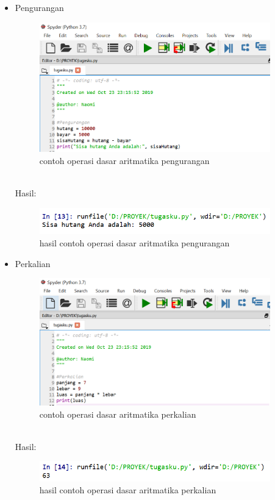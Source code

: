 \begin{enumerate}
\begin{itemize}
\item Pengurangan
\begin{figure}[!htbp]
\centering
\includegraphics[width=10cm]{gambar2/kurang.png}
\caption{contoh operasi dasar aritmatika pengurangan}
\end{figure}\\
\newpage
Hasil:
\begin{figure}[!htbp]
\centering
\includegraphics[width=10cm]{gambar2/krg1.png}
\caption{hasil contoh operasi dasar aritmatika pengurangan}
\end{figure}
\item Perkalian
\begin{figure}[!htbp]
\centering
\includegraphics[width=10cm]{gambar2/kali.png}
\caption{contoh operasi dasar aritmatika perkalian}
\end{figure}\\
Hasil:
\begin{figure}[!htbp]
\centering
\includegraphics[width=10cm]{gambar2/kali1.png}
\caption{hasil contoh operasi dasar aritmatika perkalian}
\end{figure}


\end{itemize}
\end{enumerate}
